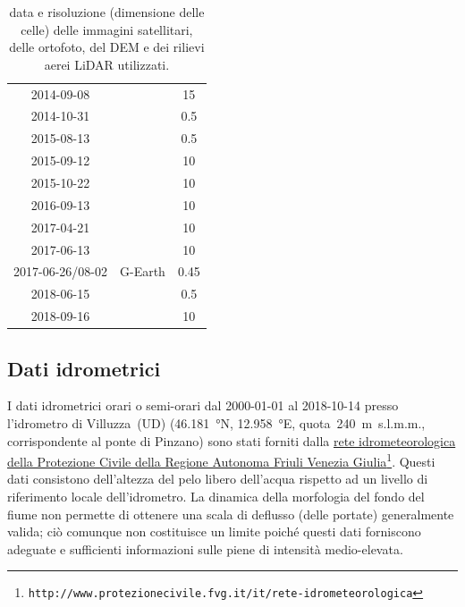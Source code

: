 \begin{table}[p]
\begin{tabular}{c c S[table-format=2.2]}
		2014-09-08		&	\AST{}		&	15	\\
		2014-10-31		&	\Pl{}	&	0.5	\\
		2015-08-13		&	\Pl{}	&	0.5	\\
		2015-09-12		&	\Se{}	&	10	\\
		2015-10-22		&	\Se{}	&	10	\\
		2016-09-13		&	\Se{}	&	10	\\
		2017-04-21		&	\Se{}	&	10	\\
		2017-06-13		&	\Se{}	&	10	\\
		2017-06-26/08-02	&	G-Earth	&	0.45	\\
		2018-06-15		&	\WV{}	&	0.5	\\
		2018-09-16		&	\Se{}	&	10	\\
		\bottomrule
	\end{tabular}
	\caption{data e risoluzione (dimensione delle celle) delle immagini satellitari, delle ortofoto, del DEM e dei rilievi aerei LiDAR utilizzati.}
	\label{tab:date-orto-sat}
\end{table}


\subsection{Dati idrometrici}
I dati idrometrici orari o semi-orari dal 2000-01-01 al 2018-10-14 presso l'idrometro di Villuzza~(UD) (\SI{46.181}{\degree}N, \SI{12.958}{\degree}E, quota~\SI{240}{\m}~s.l.m.m., corrispondente al ponte di Pinzano) sono stati forniti dalla \href{http://www.protezionecivile.fvg.it/it/rete-idrometeorologica}{rete idrometeorologica della Protezione Civile della Regione Autonoma Friuli Venezia Giulia}\footnote{\texttt{http://www.protezionecivile.fvg.it/it/rete-idrometeorologica}}.
Questi dati consistono dell'altezza del pelo libero dell'acqua rispetto ad un livello di riferimento locale dell'idrometro.
La dinamica della morfologia del fondo del fiume non permette di ottenere una scala di deflusso (delle portate) generalmente valida; ciò comunque non costituisce un limite poiché questi dati forniscono adeguate e sufficienti informazioni sulle piene di intensità medio-elevata.

